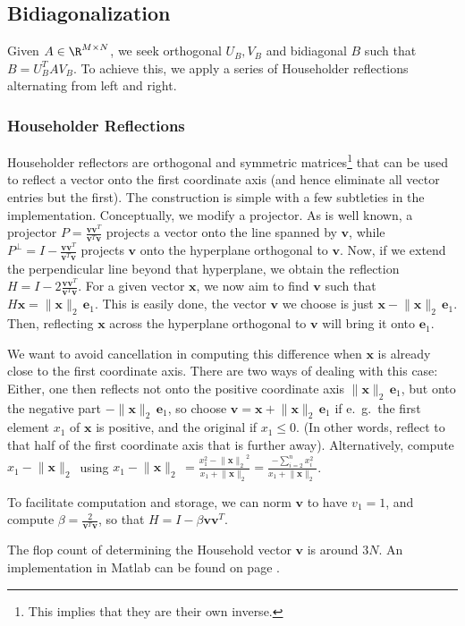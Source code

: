 \documentclass[11pt]{article}
\newcommand{\ve}[1]{\ensuremath{\mathbf{#1}}}
\newcommand{\tnorm}[1]{\ensuremath{\lVert{\ve{#1}}\rVert_2\,}}
\newcommand{\tnormns}[1]{\ensuremath{\lVert{\ve{#1}}\rVert_2}}
\newcommand{\sfrac}[2]{\ensuremath{{\scriptstyle\frac{\scriptstyle #1}{\scriptstyle #2}}}}
\begin{document}
\subsection{Bidiagonalization}
Given $A \in\R^{M\times N}$, we seek orthogonal $U_B, V_B$ and bidiagonal $B$ such that $B = U_B^T A V_B$. To achieve this, we apply a series of Householder reflections alternating from left and right.

\subsubsection{Householder Reflections}
Householder reflectors are orthogonal and symmetric matrices\footnote{This implies that they are their own inverse.} that can be used to reflect a vector onto the first coordinate axis (and hence eliminate all vector entries but the first). The construction is simple with a few subtleties in the implementation. Conceptually, we modify a projector. As is well known, a projector $P =\sfrac{\ve v\ve v^T}{\ve v^T\ve v}$ projects a vector onto the line spanned by $\ve v$, while $P^\bot = I - \sfrac{\ve v\ve v^T}{\ve v^T\ve v}$ projects $\ve v$ onto the hyperplane orthogonal to $\ve v$. Now, if we extend the perpendicular line beyond that hyperplane, we obtain the reflection $H = I - 2\sfrac{\ve v\ve v^T}{\ve v^T\ve v}$. For a given vector $\ve x$, we now aim to find $\ve v$ such that $H\ve x=\tnorm x\ve e_1$. This is easily done, the vector \ve v we choose is just $\ve x -\tnorm x \ve e_1$. Then, reflecting \ve x across the hyperplane orthogonal to \ve v will bring it onto $\ve e_1$.

We want to avoid cancellation in computing this difference when \ve x is already close to the first coordinate axis. There are two ways of dealing with this case: Either, one then reflects not onto the positive coordinate axis $\tnorm x \ve e_1$, but onto the negative part $-\tnorm x \ve e_1$, so choose $\ve v = \ve x + \tnorm x \ve e_1$ if e.~g.\ the first element $x_1$ of \ve x is positive, and the original if $x_1\le 0$. (In other words, reflect to that half of the first coordinate axis that is further away).
Alternatively, compute $x_1 - \tnorm x$ using $x_1 - \tnorm x = \frac{x_1^2 - \tnormns x^2}{x_1 + \tnorm x}=\frac{-\sum_{i=2}^n x_i^2}{x_1 + \tnorm x}$.

To facilitate computation and storage, we can norm \ve v to have $v_1=1$, and compute $\beta = \frac 2{\ve v^T \ve v}$, so that $H = I - \beta \ve v \ve v^T$.

The flop count of determining the Household vector \ve v is around $3N$. An implementation in Matlab can be found on page \pageref{rc:house}.
\end{document}
